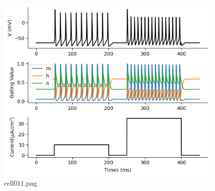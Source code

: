 \begin{figure}[ht]
	\centering
	\includegraphics[scale=0.8, max width=\linewidth]{./fig/neuron-model/hodgkin-huxley/cell011.png}
	\caption{cell011.png}
	\label{cell011.png}
\end{figure}